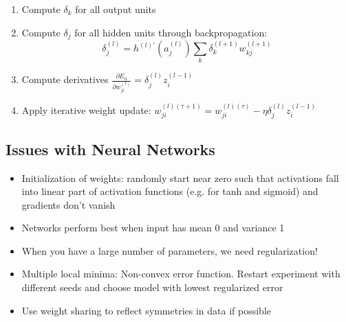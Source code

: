 \begin{itemize}
	\begin{enumerate}
		\item Compute $\delta_k$ for all output units
		\item Compute $\delta_j$ for all hidden units through backpropagation:
		$$\delta_j^{(l)} = h^{(l)'}\left(a_j^{(l)}\right)\sum\limits_{k}\delta_k^{(l+1)}w_{kj}^{(l+1)}$$
		\item Compute derivatives $\frac{\partial E_n}{\partial w_{ji}^{(l)}}=\delta_j^{(l)}z_{i}^{(l-1)}$
		\item Apply iterative weight update: 
		$w_{ji}^{(l)(\tau+1)} = w_{ji}^{(l)(\tau)}-\eta \delta_j^{(l)}z_{i}^{(l-1)}$
	\end{enumerate}
\end{itemize}
\subsection{Issues with Neural Networks}
\begin{itemize}
	\item Initialization of weights: randomly start near zero such that activations fall into linear part of activation functions (e.g. for tanh and sigmoid) and gradients don't vanish
	\item Networks perform best when input has mean 0 and variance 1
	\item When you have a large number of parameters, we need regularization!
	\item Multiple local minima: Non-convex error function. Restart experiment with different seeds and choose model with lowest regularized error
	\item Use weight sharing to reflect symmetries in data if possible
\end{itemize}